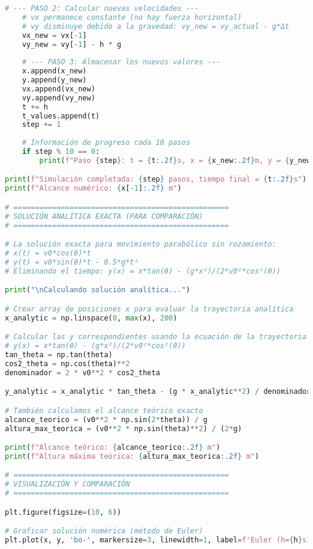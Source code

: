 \documentclass[12pt,a4paper]{article}
\begin{document}
\begin{lstlisting}[language=Python, basicstyle=\small\ttfamily]
    # --- PASO 2: Calcular nuevas velocidades ---
    # vx permanece constante (no hay fuerza horizontal)
    # vy disminuye debido a la gravedad: vy_new = vy_actual - g*Δt
    vx_new = vx[-1]  
    vy_new = vy[-1] - h * g
    
    # --- PASO 3: Almacenar los nuevos valores ---
    x.append(x_new)
    y.append(y_new)
    vx.append(vx_new)
    vy.append(vy_new)
    t += h
    t_values.append(t)
    step += 1
    
    # Información de progreso cada 10 pasos
    if step % 10 == 0:
        print(f"Paso {step}: t = {t:.2f}s, x = {x_new:.2f}m, y = {y_new:.2f}m")

print(f"Simulación completada: {step} pasos, tiempo final = {t:.2f}s")
print(f"Alcance numérico: {x[-1]:.2f} m")

# ==================================================
# SOLUCIÓN ANALÍTICA EXACTA (PARA COMPARACIÓN)
# ==================================================

# La solución exacta para movimiento parabólico sin rozamiento:
# x(t) = v0*cos(θ)*t
# y(t) = v0*sin(θ)*t - 0.5*g*t²
# Eliminando el tiempo: y(x) = x*tan(θ) - (g*x²)/(2*v0²*cos²(θ))

print("\nCalculando solución analítica...")

# Crear array de posiciones x para evaluar la trayectoria analítica
x_analytic = np.linspace(0, max(x), 200)

# Calcular las y correspondientes usando la ecuación de la trayectoria
# y(x) = x*tan(θ) - (g*x²)/(2*v0²*cos²(θ))
tan_theta = np.tan(theta)
cos2_theta = np.cos(theta)**2
denominador = 2 * v0**2 * cos2_theta

y_analytic = x_analytic * tan_theta - (g * x_analytic**2) / denominador

# También calculamos el alcance teórico exacto
alcance_teorico = (v0**2 * np.sin(2*theta)) / g
altura_max_teorica = (v0**2 * np.sin(theta)**2) / (2*g)

print(f"Alcance teórico: {alcance_teorico:.2f} m")
print(f"Altura máxima teórica: {altura_max_teorica:.2f} m")

# ==================================================
# VISUALIZACIÓN Y COMPARACIÓN
# ==================================================

plt.figure(figsize=(10, 6))

# Graficar solución numérica (método de Euler)
plt.plot(x, y, 'bo-', markersize=3, linewidth=1, label=f'Euler (h={h}s)')


\end{lstlisting}
\end{document}
